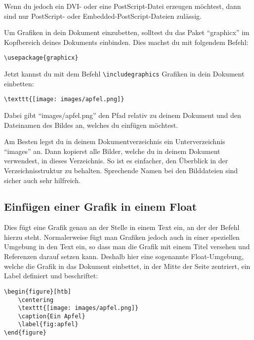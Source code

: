 Wenn du jedoch ein DVI- oder eine PostScript-Datei erzeugen möchtest, dann sind nur PostScript- oder Embedded-PostScript-Dateien zulässig.

Um Grafiken in dein Dokument einzubetten, solltest du das Paket \enquote{graphicx} im Kopfbereich deines Dokuments einbinden. Dies machst du mit folgendem Befehl:

\begin{lstlisting}
\usepackage{graphicx}
\end{lstlisting}

Jetzt kannst du mit dem Befehl \texttt{\textbackslash includegraphics} Grafiken in dein Dokument einbetten:

\begin{lstlisting}
\texttt{[image: images/apfel.png]}
\end{lstlisting}

Dabei gibt \enquote{images/apfel.png} den Pfad relativ zu deinem Dokument und den Dateinamen des Bildes an, welches du einfügen möchtest.

Am Besten legst du in deinem Dokumentverzeichnis ein Unterverzeichnis \enquote{images} an. Dann kopierst alle Bilder, welche du in deinem Dokument verwendest, in dieses Verzeichnis. So ist es einfacher, den Überblick in der Verzeichnisstruktur zu behalten. Sprechende Namen bei den Bilddateien sind sicher auch sehr hilfreich.

\subsection{Einfügen einer Grafik in einem Float}

Dies fügt eine Grafik genau an der Stelle in einem Text ein, an der der Befehl hierzu steht. Normalerweise fügt man Grafiken jedoch auch in einer speziellen Umgebung in den Text ein, so dass man die Grafik mit einem Titel versehen und Referenzen darauf setzen kann. Deshalb hier eine sogenannte Float-Umgebung, welche die Grafik in das Dokument einbettet, in der Mitte der Seite zentriert, ein Label definiert und beschriftet:

\begin{lstlisting}
\begin{figure}[htb]
	\centering
	\texttt{[image: images/apfel.png]}
	\caption{Ein Apfel}
	\label{fig:apfel}
\end{figure}
\end{lstlisting}

